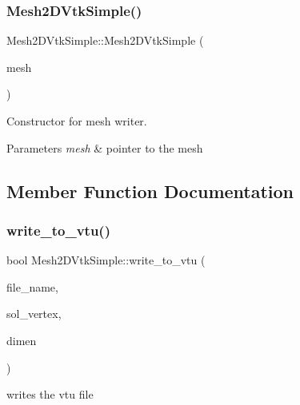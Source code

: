 \subsubsection{\texorpdfstring{Mesh2\+D\+Vtk\+Simple()}{Mesh2DVtkSimple()}}
{\footnotesize\ttfamily Mesh2\+D\+Vtk\+Simple\+::\+Mesh2\+D\+Vtk\+Simple (\begin{DoxyParamCaption}\item[{\hyperlink{classMeshFramework2D_1_1Mesh2D}{Mesh2D} $\ast$}]{mesh }\end{DoxyParamCaption})}



Constructor for mesh writer. 


\begin{DoxyParams}{Parameters}
{\em mesh} & pointer to the mesh \\
\hline
\end{DoxyParams}


\subsection{Member Function Documentation}
\mbox{\label{classMeshFramework2D_1_1Mesh2DVtkSimple_ad26d743f8c0a3ee17f7c4e62d5cdffbd}} 
\subsubsection{\texorpdfstring{write\+\_\+to\+\_\+vtu()}{write\_to\_vtu()}\hspace{0.1cm}{\footnotesize\ttfamily [1/2]}}
{\footnotesize\ttfamily bool Mesh2\+D\+Vtk\+Simple\+::write\+\_\+to\+\_\+vtu (\begin{DoxyParamCaption}\item[{std\+::string}]{file\+\_\+name,  }\item[{Eigen\+::\+Vector\+Xd}]{sol\+\_\+vertex,  }\item[{bool}]{dimen }\end{DoxyParamCaption})}



writes the vtu file 


